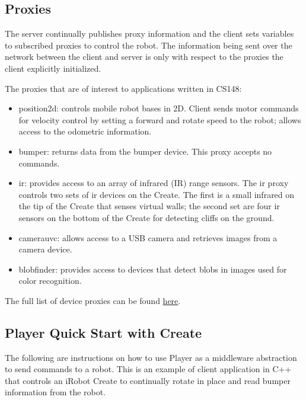 \subsection{Proxies}
 
The server continually publishes proxy information and the client sets variables to subscribed proxies to control the robot. The information being sent over the network between the client and server is only with respect to the proxies the client explicitly initialized. 

The proxies that are of interest to applications written in CS148:
\begin{itemize}
\item position2d: controls mobile robot bases in 2D. Client sends motor commands for velocity control by setting a forward and rotate speed to the robot; allows access to the odometric information.
\item bumper: returns data from the bumper device. This proxy accepts no commands.
\item ir: provides access to an array of infrared (IR) range sensors. The ir proxy controls two sets of ir devices on the Create. The first is a small infrared on the tip of the Create that senses virtual walls; the second set are four ir sensors on the bottom of the Create for detecting cliffs on the ground.
\item camerauvc: allows access to a USB camera and retrieves images from a camera device.
\item blobfinder: provides access to devices that detect blobs in images used for color recognition. 
\end{itemize} 

The full list of device proxies can be found \href{http://playerstage.sourceforge.net/doc/Player-cvs/player/group\_\_playerc\_\_proxies.html}{here}.

\subsection{Player Quick Start with Create}
\label{sec:player_quickstart}

The following are instructions on how to use Player as a middleware
abstraction to send commands to a robot. This is an example of client
application in C++ that controls an iRobot Create to continually
rotate in place and read bumper information from the robot.

